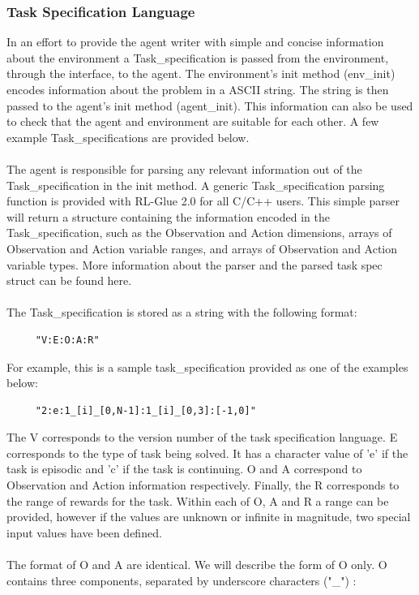 \documentclass[11pt]{article}
\begin{document}
\subsubsection{Task Specification Language}
\label{task}
In an effort to provide the agent writer with simple and concise information about the environment a Task\_specification is passed from the environment, through the interface, to the agent. The environment's init method (env\_init) encodes information about the problem in a ASCII string. The string is then passed to the agent's init method (agent\_init).  This information can also be used to check that the agent and environment are suitable for each other. A few example Task\_specifications are provided below.
\\\\
The agent is responsible for parsing any relevant information out of the Task\_specification in the init method. A generic Task\_specification parsing function is provided with RL-Glue 2.0 for all C/C++ users. This simple parser will return a structure containing the information encoded in the Task\_specification, such as the Observation and Action dimensions, arrays of Observation and Action variable ranges, and arrays of Observation and Action variable types. More information about the parser and the parsed task spec struct can be found here.
\\\\
The Task\_specification is stored as a string with the following format:
\begin{verbatim}
     "V:E:O:A:R"
\end{verbatim}		
For example, this is a sample task\_specification provided as one of the examples below:
\begin{verbatim}
     "2:e:1_[i]_[0,N-1]:1_[i]_[0,3]:[-1,0]"
\end{verbatim}     
The V corresponds to the version number of the task specification language. E corresponds to the type of task being solved. It has a character value of 'e' if the task is episodic and 'c' if the task is continuing. O and A correspond to Observation and Action information respectively. Finally, the R corresponds to the range of rewards for the task. Within each of O, A and R a range can be provided, however if the values are unknown or infinite in magnitude, two special input values have been defined.
\\\\
The format of O and A are identical. We will describe the form of O only. O contains three components, separated by underscore characters ("\_") :
\end{document}
